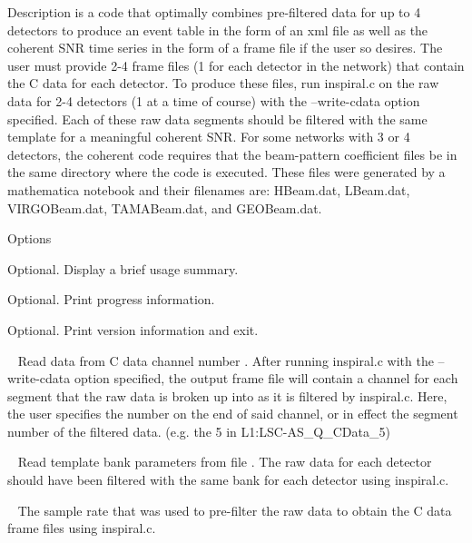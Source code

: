 \begin{entry}
\item[Description] 
 is a code that optimally combines 
pre-filtered data for up to 4 detectors to produce an event table in the form 
of an xml file as well as the coherent SNR time series in the form of a frame 
file if the user so desires.  The user must provide 2-4 frame files 
(1 for each detector in the network) that contain the C data for each detector.
To produce these files, run inspiral.c on the raw data for 2-4 detectors 
(1 at a time of course) with the --write-cdata option specified. Each of these
raw data segments should be filtered with the same template for a meaningful 
coherent SNR. For some networks with 3 or 4 detectors, the coherent code 
requires that the beam-pattern coefficient files be in the same directory where
the code is executed.  These files were generated by a mathematica notebook  
and their filenames are: HBeam.dat, LBeam.dat, VIRGOBeam.dat, TAMABeam.dat, 
and GEOBeam.dat.     

\item[Options]\leavevmode
\begin{entry}
\item[\option{--help}] Optional. Display a brief usage summary.

\item[\option{--verbose}] Optional. Print progress information.

\item[\option{--version}] Optional. Print version information and exit.

\item[\option{--channel-number}~\parm{CHANNUMBER}] Read data from 
C data channel number . After running inspiral.c with the 
--write-cdata option specified, the output frame file will contain a channel 
for each segment that the raw data is broken up into as it is filtered by 
inspiral.c. Here, the user specifies the number on the end of said channel, or in effect the segment number of the filtered data.  (e.g. the 5 in L1:LSC-AS\_Q\_CData\_5) 

\item[\option{--bank-file}~\parm{FILE}] Read template bank parameters 
from file . The raw data for each detector should have been filtered
with the same bank for each detector using inspiral.c.

\item[\option{--sample-rate}~\parm{F}] The sample rate that was used to 
pre-filter the raw data to obtain the C data frame files using inspiral.c.  


\end{entry}
\end{entry}
